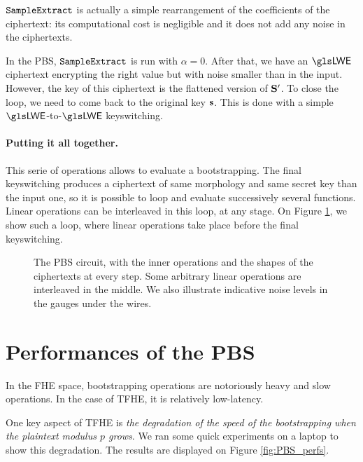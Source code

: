 $\texttt{SampleExtract}$ is actually a simple rearrangement of the coefficients of the ciphertext: its computational cost is negligible and it does not add any noise in the ciphertexts.






In the \gls{PBS}, $\texttt{SampleExtract}$ is run with $\alpha = 0$. After that, we have an $\LWE$ ciphertext encrypting the right value but with noise smaller than in the input. However, the key of this ciphertext is the flattened version of $\mathbf S'$. To close the loop, we need to come back to the original key $\mathbf s$. This is done with a simple $\LWE$-to-$\LWE$ keyswitching.



\paragraph{Putting it all together.}
This serie of operations allows to evaluate a bootstrapping. The final keyswitching produces a ciphertext of same morphology and same secret key than the input one, so it is possible to loop and evaluate successively several functions. Linear operations can be interleaved in this loop, at any stage. On Figure \ref{fig:PBS_layout}, we show such a loop, where linear operations take place before the final keyswitching.



\begin{figure}
	\centering
	
	\caption{The \gls{PBS} circuit, with the inner operations and the shapes of the ciphertexts at every step. Some arbitrary linear operations are interleaved in the middle. We also illustrate indicative noise levels in the gauges under the wires.}
	\label{fig:PBS_layout}
\end{figure}


\section{Performances of the PBS}
\label{sec:pbs_performances}


In the \gls{FHE} space, bootstrapping operations are notoriously heavy and slow operations. In the case of \gls{TFHE}, it is relatively low-latency. 

One key aspect of \gls{TFHE} is \textit{the degradation of the speed of the bootstrapping when the plaintext modulus $p$ grows}. We ran some quick experiments on a laptop to show this degradation. The results are displayed on Figure \ref{fig:PBS_perfs}.


